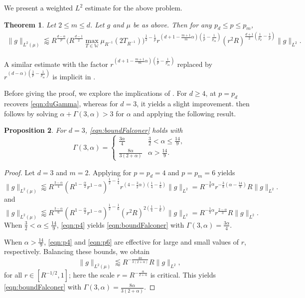 \documentclass[11pt]{amsart}
\newtheorem{theorem}{Theorem}[section]
\newtheorem{prop}[theorem]{Proposition}
\theoremstyle{definition}
\theoremstyle{remark}
\numberwithin{equation}{section}
\newcommand{\W}{\mathbb{W}}
\newcommand{\less}{\lessapprox}
\begin{document}
We present a weighted $L^2$ estimate for the above problem.
\begin{theorem}\label{thm:decFalconer}
	Let $2\leq m \leq d$. Let $g$ and $\mu$ be as above. Then for any $p_d\leq p\leq p_m$, 
	\begin{align*}
		\| g\|_{L^2(\mu)} \less R^{\frac{d-\alpha}{p}}  \Big(R^{\frac{d-1}{2}} \max_{T\in \W} \mu_{R^{-1}}(2T_{R^{-1}}) \Big)^{\frac{1}{2}-\frac{1}{p}}  r^{(d+1 - \frac{m+1}{m}\alpha)(\frac{1}{p}-\frac{1}{p_m})} (r^2 R)^{\frac{d+1}{2}(\frac{1}{p_d} -\frac{1}{p})} \| g\|_{L^2}.
	\end{align*}
\end{theorem}
A similar estimate with the factor $r^{(d+1 - \frac{m+1}{m}\alpha)(\frac{1}{p}-\frac{1}{p_m})}$ replaced by $r^{(d - \alpha)(\frac{1}{p}-\frac{1}{p_m})}$ is implicit in \cite{du2023weighted}. 

Before giving the proof, we explore the implications  of . For $d\geq 4$,  at $p=p_d$ recovers \eqref{eqn:duGamma}, whereas for $d=3$, it yields a slight improvement.    then follows by solving $\alpha+\Gamma(3,\alpha) > 3$ for $\alpha$ and applying the following result.
\begin{prop}\label{cor:decFalconer}
	For $d=3$,  \eqref{eqn:boundFalconer} holds with
	\[ \Gamma(3,\alpha) = \begin{cases}
		\frac{3\alpha}{4} & \frac{3}{2} < \alpha \leq \frac{14}{9}, \\
		\frac{8\alpha}{3(2+\alpha)} & \alpha > \frac{14}{9}.
	\end{cases} \]
\end{prop}
\begin{proof}
	Let $d=3$ and $m=2$. Applying  for  $p=p_d=4$ and $p=p_m = 6$ yields 
	\begin{equation}\label{eqn:p4}
		\| g\|_{L^2(\mu)} \less R^{\frac{3-\alpha}{4}}  (R^{1-\frac{\alpha}{2}} r^{1-\alpha} )^{\frac{1}{2}-\frac{1}{4}} r^{(4 - \frac{3}{2}\alpha)(\frac{1}{4}-\frac{1}{6})} \| g\|_{L^2} = R^{-\frac{3}{8}\alpha} r^{-\frac{3}{8}(\alpha-\frac{14}{9})} R \| g\|_{L^2}.
	\end{equation}
	and 
	\begin{equation}\label{eqn:p6}
		\| g\|_{L^2(\mu)} \less R^{\frac{3-\alpha}{6}}  (R^{1-\frac{\alpha}{2}} r^{1-\alpha} )^{\frac{1}{2}-\frac{1}{6}} (r^2 R)^{2(\frac{1}{4} - \frac{1}{6})} \| g\|_{L^2} = R^{-\frac{1}{3}\alpha} r^{\frac{2-\alpha}{3}} R \| g\|_{L^2}.
	\end{equation}
	When $\frac{3}{2}<\alpha\leq \frac{14}{9}$, \eqref{eqn:p4} yields \eqref{eqn:boundFalconer}  with $\Gamma(3,\alpha) = \frac{3\alpha}{4}$. 
	
	When $\alpha>\frac{14}{9}$, \eqref{eqn:p4} and \eqref{eqn:p6} are effective for large and small values of $r$, respectively. Balancing these bounds, we obtain
	\[ 	\| g\|_{L^2(\mu)} \less R^{-\frac{4\alpha}{3(2+\alpha)}} R \| g\|_{L^2}, \]
	for all $r\in [R^{-1/2},1]$; here the scale $r= R^{-\frac{\alpha}{2+\alpha}}$ is critical.  This yields  \eqref{eqn:boundFalconer} with $\Gamma(3,\alpha) = \frac{8\alpha}{3(2+\alpha)}$. 
\end{proof}
\end{document}
